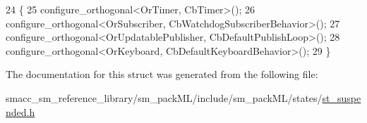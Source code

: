 \begin{DoxyCode}
24     \{
25         configure\_orthogonal<OrTimer, CbTimer>();   
26         configure\_orthogonal<OrSubscriber, CbWatchdogSubscriberBehavior>();
27         configure\_orthogonal<OrUpdatablePublisher, CbDefaultPublishLoop>();
28         configure\_orthogonal<OrKeyboard, CbDefaultKeyboardBehavior>();
29     \}
\end{DoxyCode}


The documentation for this struct was generated from the following file\+:\begin{DoxyCompactItemize}
\item 
smacc\+\_\+sm\+\_\+reference\+\_\+library/sm\+\_\+pack\+M\+L/include/sm\+\_\+pack\+M\+L/states/\hyperlink{st__suspended_8h}{st\+\_\+suspended.\+h}\end{DoxyCompactItemize}
